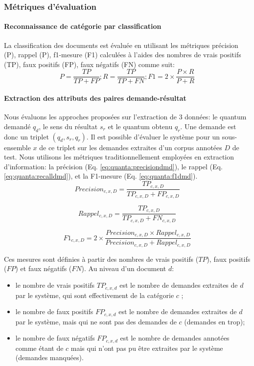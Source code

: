 \subsubsection{Métriques d'évaluation}
\paragraph{Reconnaissance de catégorie par classification}

La classification des documents est évaluée en utilisant les métriques précision (P), rappel (P), f1-mesure (F1) calculées à l'aides des nombres de vrais positifs (TP), faux positifs (FP), faux négatifs (FN) comme suit:
\[P = \frac{TP}{TP+FP}; R = \frac{TP}{TP+FN}; F1 = 2 \times \frac{P \times R}{P + R}\]

\paragraph{Extraction des attributs des paires demande-résultat}
 Nous évaluons les approches proposées sur l'extraction de 3 données: le quantum demandé $q_d$, le sens du résultat $s_r$ et le quantum obtenu $q_r$. Une demande est donc un triplet $(q_d, s_r, q_r)$. Il est possible d'évaluer le système pour un sous-ensemble $x$ de ce triplet sur les demandes extraites d'un corpus annotées $D$ de test. Nous utilisons les métriques traditionnellement employées en extraction d'information: la précision (Eq. \ref{eq:quanta:precisiondmd}), le rappel (Eq. \ref{eq:quanta:recalldmd}), et la F1-mesure (Eq. \ref{eq:quanta:f1dmd}). 
 \begin{equation}
 Precision_{c,x,D} = \frac{TP_{c,x,D}}{TP_{c,x,D} + FP_{c,x,D}}  \label{eq:quanta:precisiondmd}
\end{equation}

\begin{equation}
Rappel_{c,x,D} = \frac{TP_{c,x,D}}{TP_{c,x,D} + FN_{c,x,D}} \label{eq:quanta:recalldmd}
\end{equation}

\begin{equation}
F1_{c,x,D} =2 \times \frac{Precision_{c,x,D} \times Rappel_{c,x,D}}{Precision_{c,x,D} + Rappel_{c,x,D}} \label{eq:quanta:f1dmd}
\end{equation}

Ces mesures sont définies à partir des nombres de vrais positifs ($TP$), faux positifs ($FP$) et faux négatifs ($FN$). Au niveau d'un document $d$:
\begin{itemize}
\item le nombre de vrais positifs $TP_{c, x, d}$ est le nombre de demandes extraites de $d$ par le système, qui sont effectivement de la catégorie $c$ ;
\item le nombre de faux positifs $FP_{c, x, d}$ est le nombre de demandes extraites de $d$ par le système, mais qui ne sont pas des demandes de $c$ (demandes en trop);
\item le nombre de faux négatifs $FP_{c, x, d}$ est le nombre de demandes annotées comme étant de $c$ mais qui n'ont pas pu être extraites par le système (demandes manquées).
\end{itemize}

